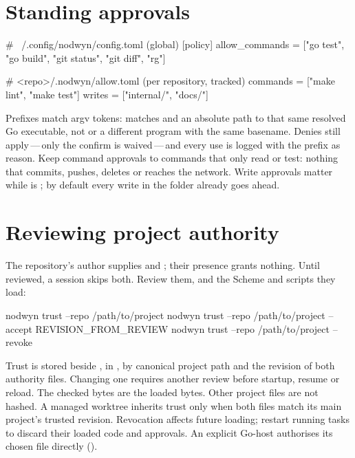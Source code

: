 \section{Standing approvals}

\begin{txt}
# ~/.config/nodwyn/config.toml           (global)
[policy]
allow_commands = ["go test", "go build", "git status", "git diff", "rg"]

# <repo>/.nodwyn/allow.toml              (per repository, tracked)
commands = ["make lint", "make test"]
writes   = ["internal/", "docs/"]
\end{txt}

Prefixes match argv tokens:  matches 
and an absolute path to that same resolved Go executable, not 
or a different program with the same basename. Denies still
apply\,---\,only the confirm is waived\,---\,and every use is logged with the
prefix as reason. Keep command approvals to commands that only read or
test: nothing that commits, pushes, deletes or reaches the network. Write
approvals matter while  is ; by default
every write in the folder already goes ahead.

\section{Reviewing project authority}

The repository's author supplies  and
; their presence grants nothing. Until reviewed,
a session skips both. Review them, and the Scheme and scripts they load:

\begin{sh}
nodwyn trust --repo /path/to/project
nodwyn trust --repo /path/to/project --accept REVISION_FROM_REVIEW
nodwyn trust --repo /path/to/project --revoke
\end{sh}

Trust is stored beside , in ,
by canonical project path and the revision of both authority files. Changing
one requires another review before startup, resume or reload. The checked bytes
are the loaded bytes. Other project files are not hashed. A managed worktree
inherits trust only when both files match its main project's trusted revision.
Revocation affects future loading; restart running tasks to discard their loaded
code and approvals. An explicit Go-host  authorises its
chosen file directly ().

